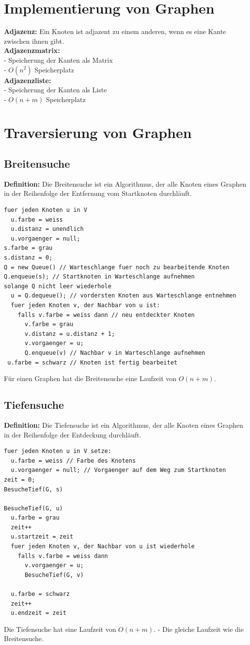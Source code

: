 \documentclass{scrreprt}
\begin{document}
\section{Implementierung von Graphen}
\textbf{Adjazenz:} Ein Knoten ist adjazent zu einem anderen, wenn es eine Kante zwischen ihnen gibt.
\\\textbf{Adjazenzmatrix:}
\\- Speicherung der Kanten als Matrix
\\- $O(n^2)$ Speicherplatz
\\\textbf{Adjazenzliste:}
\\- Speicherung der Kanten als Liste
\\- $O(n+m)$ Speicherplatz
\section{Traversierung von Graphen}
\subsection{Breitensuche}
\textbf{Definition:} Die Breitensuche ist ein Algorithmus, der alle Knoten eines Graphen in der Reihenfolge der Entfernung vom Startknoten durchläuft.
\begin{lstlisting}
fuer jeden Knoten u in V
  u.farbe = weiss
  u.distanz = unendlich
  u.vorgaenger = null;
s.farbe = grau
s.distanz = 0;
Q = new Queue() // Warteschlange fuer noch zu bearbeitende Knoten
Q.enqueue(s); // Startknoten in Warteschlange aufnehmen
solange Q nicht leer wiederhole
  u = Q.dequeue(); // vordersten Knoten aus Warteschlange entnehmen
  fuer jeden Knoten v, der Nachbar von u ist:
    falls v.farbe = weiss dann // neu entdeckter Knoten
      v.farbe = grau
      v.distanz = u.distanz + 1;
      v.vorgaenger = u;
      Q.enqueue(v) // Nachbar v in Warteschlange aufnehmen
 u.farbe = schwarz // Knoten ist fertig bearbeitet
\end{lstlisting}
Für einen Graphen hat die Breitensuche eine Laufzeit von $O(n+m)$.
\subsection{Tiefensuche}
\textbf{Definition:} Die Tiefensuche ist ein Algorithmus, der alle Knoten eines Graphen in der Reihenfolge der Entdeckung durchläuft.
\begin{lstlisting}
fuer jeden Knoten u in V setze:
  u.farbe = weiss // Farbe des Knotens
  u.vorgaenger = null; // Vorgaenger auf dem Weg zum Startknoten
zeit = 0;
BesucheTief(G, s)
  
BesucheTief(G, u)
  u.farbe = grau
  zeit++
  u.startzeit = zeit
  fuer jeden Knoten v, der Nachbar von u ist wiederhole
    falls v.farbe = weiss dann
      v.vorgaenger = u;
      BesucheTief(G, v)
  
  u.farbe = schwarz
  zeit++
  u.endzeit = zeit
\end{lstlisting}
Die Tiefensuche hat eine Laufzeit von $O(n+m)$. - Die gleiche Laufzeit wie die Breitensuche.
\end{document}
